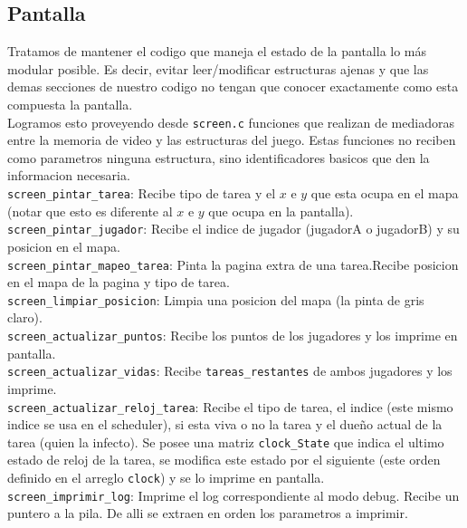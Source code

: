\subsection{Pantalla}

Tratamos de mantener el codigo que maneja el estado de la pantalla lo más modular posible. Es decir, evitar leer/modificar estructuras ajenas  y que las demas secciones de nuestro codigo no tengan que conocer exactamente como esta compuesta la pantalla.\\

Logramos esto proveyendo desde  \verb|screen.c| funciones que realizan de mediadoras entre la memoria de video y las estructuras del juego. Estas funciones no reciben como parametros ninguna estructura, sino identificadores basicos que den la informacion necesaria.\\

\verb|screen_pintar_tarea|: Recibe tipo de tarea y el $x$ e $y$ que esta ocupa en el mapa (notar que esto es diferente al $x$ e $y$ que ocupa en la pantalla).\\

\verb|screen_pintar_jugador|: Recibe el indice de jugador (jugadorA o jugadorB) y su posicion en el mapa.\\

\verb|screen_pintar_mapeo_tarea|: Pinta la pagina extra de una tarea.Recibe posicion en el mapa de la pagina y tipo de tarea.\\

\verb|screen_limpiar_posicion|: Limpia una posicion del mapa (la pinta de gris claro).\\

\verb|screen_actualizar_puntos|: Recibe los puntos de los jugadores y los imprime en pantalla.\\

\verb|screen_actualizar_vidas|: Recibe \verb|tareas_restantes| de ambos jugadores y los imprime.\\

\verb|screen_actualizar_reloj_tarea|: Recibe el tipo de tarea, el indice (este mismo indice se usa en el scheduler), si esta viva o no la tarea y el dueño actual de la tarea (quien la infecto). Se posee una matriz \verb|clock_State| que indica el ultimo estado de reloj de la tarea, se modifica este estado por el siguiente (este orden definido en el arreglo \verb|clock|) y se lo imprime en pantalla.\\

\verb|screen_imprimir_log|: Imprime el log correspondiente al modo debug. Recibe un puntero a la pila. De alli se extraen en orden los parametros a imprimir.\\

